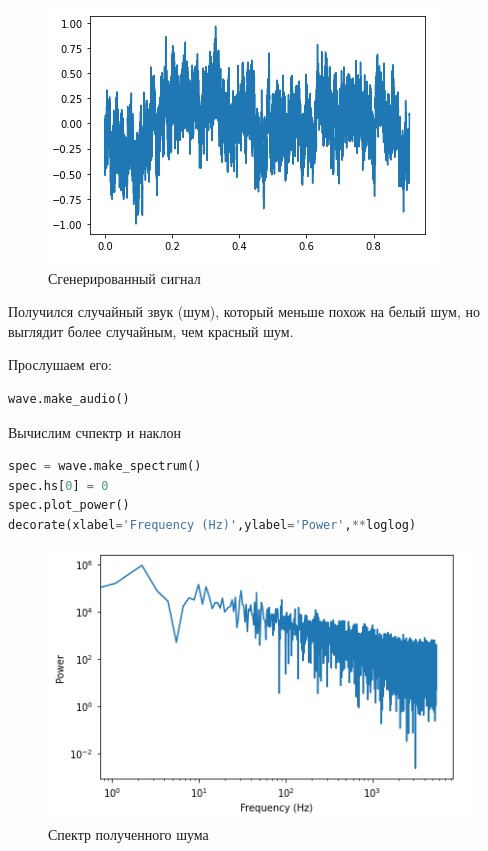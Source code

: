 \begin{figure}[H]
	\begin{center}
		\includegraphics[scale=1]{fig/lab04/lab04_12.png}
		\caption{Сгенерированный сигнал}
	\end{center}
\end{figure}

Получился случайный звук (шум), который меньше похож на белый шум, но выглядит более случайным, чем красный шум.

Прослушаем его:

\begin{lstlisting}[language=Python]
wave.make_audio()
\end{lstlisting}

Вычислим счпектр и наклон

\begin{lstlisting}[language=Python]
spec = wave.make_spectrum()
spec.hs[0] = 0
spec.plot_power()
decorate(xlabel='Frequency (Hz)',ylabel='Power',**loglog)
\end{lstlisting}

\begin{figure}[H]
	\begin{center}
		\includegraphics[scale=1]{fig/lab04/lab04_13.png}
		\caption{Спектр полученного шума}
	\end{center}
\end{figure}

